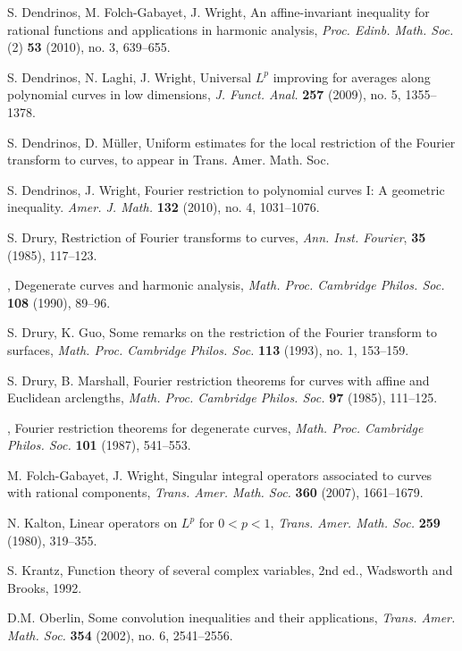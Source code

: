 \documentclass[11 pt]{amsart}
\theoremstyle{plain}
\numberwithin{equation}{section}
\theoremstyle{plain}
\numberwithin{equation}{section}
\theoremstyle{remark}
\begin{document}
\begin{thebibliography}{99999}
 S.  Dendrinos, M.  Folch-Gabayet, J.  Wright,
An affine-invariant inequality for rational functions and applications in harmonic analysis, \textit{Proc. Edinb. Math. Soc.} (2) {{\bf {53}}} (2010), no. 3, 639--655.

 S. Dendrinos, N.  Laghi, J.  Wright,  Universal $L^p$ improving for averages along polynomial curves in low dimensions, \textit{J. Funct. Anal.} {{\bf {257}}} (2009),  no. 5, 1355--1378.

 S. Dendrinos, D. M\"uller, Uniform estimates for the local restriction of the Fourier transform to curves, to appear in Trans. Amer. Math. Soc.

 S. Dendrinos, J. Wright, Fourier restriction to polynomial curves I: A geometric inequality. \textit{Amer. J. Math.} {{\bf {132}}} (2010), no. 4, 1031--1076.

 S. Drury, Restriction of Fourier transforms to curves,
\textit{Ann. Inst. Fourier}, {{\bf {35}}} (1985), 117--123.

 \bysame, Degenerate  curves and harmonic analysis,
\textit{Math. Proc. Cambridge Philos. Soc.} {{\bf {108}}} (1990),
89--96.

 S. Drury, K. Guo, Some remarks on the restriction of the Fourier transform to surfaces, \textit{Math. Proc. Cambridge Philos. Soc.} {{\bf {113}}} (1993), no. 1, 153--159.

 S. Drury, B. Marshall, Fourier restriction theorems for
curves with affine and Euclidean arclengths, \textit{Math. Proc.
Cambridge Philos. Soc.} {{\bf {97}}} (1985), 111--125.

\bysame, Fourier restriction theorems for degenerate curves,
\textit{Math. Proc. Cambridge Philos. Soc.} {{\bf {101}}} (1987),
541--553.

 M. Folch-Gabayet, J. Wright, Singular integral operators associated to curves with rational components, \textit{Trans. Amer. Math. Soc.} {{\bf {360}}} (2007), 1661--1679.

 N. Kalton, Linear operators on $L^p$ for $0<p<1$,
\textit{Trans. Amer. Math. Soc.} {{\bf {259}}} (1980), 319--355.

 S. Krantz, Function theory of several complex
variables, 2nd ed., Wadsworth and Brooks, 1992.

 D.M. Oberlin, Some convolution inequalities and their applications,
\textit{Trans. Amer. Math. Soc.} {{\bf {354}}} (2002), no. 6,
2541--2556.


\end{thebibliography}
\end{document}
